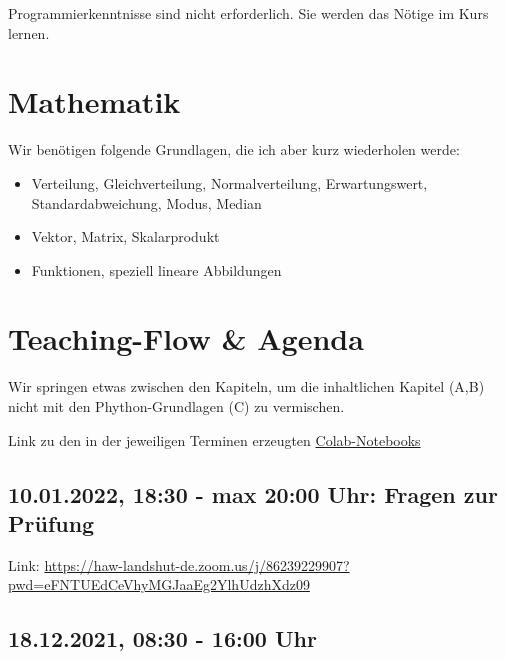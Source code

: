 \documentclass[
]{book}
\providecommand{\tightlist}{%
  \setlength{\itemsep}{0pt}\setlength{\parskip}{0pt}}
\theoremstyle{definition}
\theoremstyle{definition}
\theoremstyle{definition}
\theoremstyle{definition}
\theoremstyle{remark}
\begin{document}
Programmierkenntnisse sind nicht erforderlich. Sie werden das Nötige im Kurs lernen.

\hypertarget{mathematik}{%
\section{Mathematik}\label{mathematik}}

Wir benötigen folgende Grundlagen, die ich aber kurz wiederholen werde:

\begin{itemize}
\tightlist
\item
  Verteilung, Gleichverteilung, Normalverteilung, Erwartungswert, Standardabweichung, Modus, Median
\item
  Vektor, Matrix, Skalarprodukt
\item
  Funktionen, speziell lineare Abbildungen
\end{itemize}

\hypertarget{teaching-flow-agenda}{%
\section{Teaching-Flow \& Agenda}\label{teaching-flow-agenda}}

Wir springen etwas zwischen den Kapiteln, um die inhaltlichen Kapitel (A,B) nicht mit den Phython-Grundlagen (C) zu vermischen.

Link zu den in der jeweiligen Terminen erzeugten \href{https://github.com/Prof-Greipl/dsml-duf}{Colab-Notebooks}

\hypertarget{max-2000-uhr-fragen-zur-pruxfcfung}{%
\subsection{10.01.2022, 18:30 - max 20:00 Uhr: Fragen zur Prüfung}\label{max-2000-uhr-fragen-zur-pruxfcfung}}

Link: \url{https://haw-landshut-de.zoom.us/j/86239229907?pwd=eFNTUEdCeVhyMGJaaEg2YlhUdzhXdz09}

\hypertarget{uhr}{%
\subsection*{18.12.2021, 08:30 - 16:00 Uhr}\label{uhr}}
\end{document}
